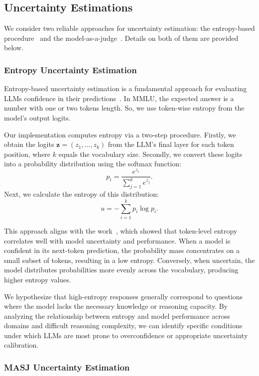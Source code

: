 \subsection{Uncertainty Estimations}

We consider two reliable approaches for uncertainty estimation: the entropy-based procedure~\cite{kadavath2022language} and the model-as-a-judge~\cite{zheng2023judging}.
Details on both of them are provided below.

\subsubsection{Entropy Uncertainty Estimation}

Entropy-based uncertainty estimation is a fundamental approach for evaluating LLMs confidence in their predictions~\cite{fadeeva2024fact}. 
In MMLU, the expected answer is a number with one or two tokens length.
So, we use token-wise entropy from the model's output logits.

Our implementation computes entropy via a two-step procedure.
Firstly, we obtain the logits $\mathbf{z} = (z_1, \ldots, z_k)$ from the LLM's final layer for each token position, where $k$ equals the vocabulary size. 
Secondly, we convert these logits into a probability distribution using the softmax function:
$$
p_i = \frac{e^{z_i}}{\sum_{j = 1}^k e^{z_j}}.
$$
Next, we calculate the entropy of this distribution:
$$
u = -\sum_{i  = 1}^k p_i \log p_i.
$$

This approach aligns with the work~\cite{kadavath2022language}, which showed that token-level entropy correlates well with model uncertainty and performance. 
When a model is confident in its next-token prediction, the probability mass concentrates on a small subset of tokens, resulting in a low entropy. Conversely, when uncertain, the model distributes probabilities more evenly across the vocabulary, producing higher entropy values.

We hypothesize that high-entropy responses generally correspond to questions where the model lacks the necessary knowledge or reasoning capacity. By analyzing the relationship between entropy and model performance across domains and difficult reasoning complexity, we can identify specific conditions under which LLMs are most prone to overconfidence or appropriate uncertainty calibration.

\subsubsection{MASJ Uncertainty Estimation}


